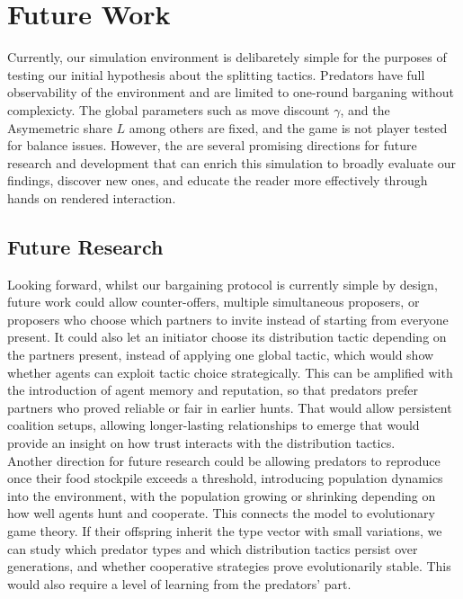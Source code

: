 \documentclass[12pt,a4paper]{report}
\begin{document}
	\section{Future Work}

	Currently, our simulation environment is delibaretely simple for the purposes of testing our initial hypothesis about the splitting tactics. Predators have full observability of the environment and are limited to one-round barganing without complexicty. The global parameters such as move discount $γ$, and the Asymemetric share $L$ among others are fixed, and the game is not player tested for balance issues. However, the are several promising directions for future research and development that can enrich this simulation to broadly evaluate our findings, discover new ones, and educate the reader more effectively through hands on rendered interaction.

	\subsection{Future Research}

	Looking forward, whilst our bargaining protocol is currently simple by design, future work could allow counter-offers, multiple simultaneous proposers, or proposers who choose which partners to invite instead of starting from everyone present. It could also let an initiator choose its distribution tactic depending on the partners present, instead of applying one global tactic, which would show whether agents can exploit tactic choice strategically. This can be amplified with the introduction of agent memory and reputation, so that predators prefer partners who proved reliable or fair in earlier hunts. That would allow persistent coalition setups, allowing longer-lasting relationships to emerge that would provide an insight on how trust interacts with the distribution tactics. \\
	
	Another direction for future research could be allowing predators to reproduce once their food stockpile exceeds a threshold, introducing population dynamics into the environment, with the population growing or shrinking depending on how well agents hunt and cooperate. This connects the model to evolutionary game theory. If their offspring inherit the type vector with small variations, we can study which predator types and which distribution tactics persist over generations, and whether cooperative strategies prove evolutionarily stable. This would also require a level of learning from the predators' part. \\
\end{document}
